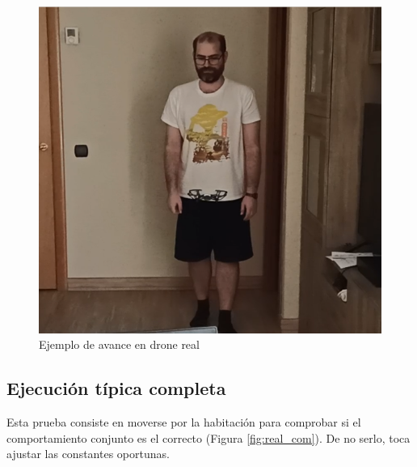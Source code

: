 \begin{figure}[!htb]
    \includegraphics[width=\linewidth]{figures/real/avanceR_3.png}
\endminipage\hfill
\caption{Ejemplo de avance en drone real}
\label{fig:real_avance}
\end{figure}
\subsection{Ejecución típica completa}
Esta prueba consiste en moverse por la habitación para comprobar si el comportamiento conjunto es el correcto (Figura \ref{fig:real_com}). De no serlo, toca ajustar las constantes oportunas.


